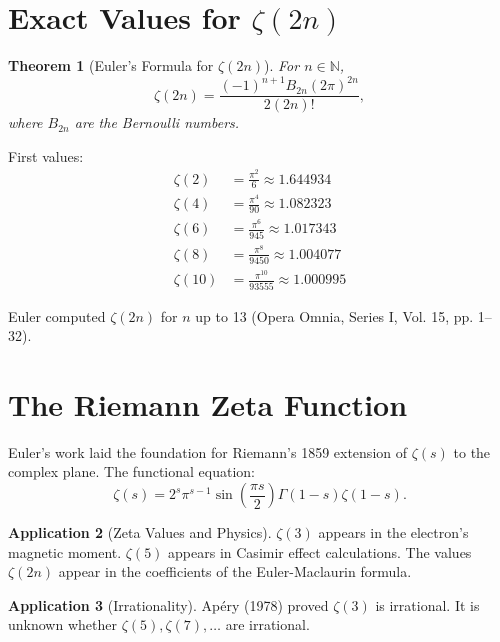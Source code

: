 \documentclass[11pt,a4paper,twoside]{book}
\theoremstyle{eulerstyle}
\newtheorem{theorem}{Theorem}[chapter]
\theoremstyle{definition}
\newtheorem{application}[theorem]{Application}
\newcommand{\N}{\mathbb{N}}
\begin{document}
\section{Exact Values for $\zeta(2n)$}

\begin{theorem}[Euler's Formula for $\zeta(2n)$]
For $n \in \N$,
\[
\zeta(2n) = \frac{(-1)^{n+1} B_{2n} (2\pi)^{2n}}{2(2n)!},
\]
where $B_{2n}$ are the Bernoulli numbers.
\end{theorem}

First values:
\begin{align*}
\zeta(2)  &= \frac{\pi^2}{6} \approx 1.644934 \\
\zeta(4)  &= \frac{\pi^4}{90} \approx 1.082323 \\
\zeta(6)  &= \frac{\pi^6}{945} \approx 1.017343 \\
\zeta(8)  &= \frac{\pi^8}{9450} \approx 1.004077 \\
\zeta(10) &= \frac{\pi^{10}}{93555} \approx 1.000995
\end{align*}

Euler computed $\zeta(2n)$ for $n$ up to 13 (Opera Omnia, Series I, Vol. 15, pp. 1--32).

\section{The Riemann Zeta Function}

Euler's work laid the foundation for Riemann's 1859 extension of $\zeta(s)$ to the complex plane. The functional equation:
\[
\zeta(s) = 2^s \pi^{s-1} \sin\left(\frac{\pi s}{2}\right) \Gamma(1-s) \zeta(1-s).
\]

\begin{application}[Zeta Values and Physics]
$\zeta(3)$ appears in the electron's magnetic moment. $\zeta(5)$ appears in Casimir effect calculations. The values $\zeta(2n)$ appear in the coefficients of the Euler-Maclaurin formula.
\end{application}

\begin{application}[Irrationality]
Apéry (1978) proved $\zeta(3)$ is irrational. It is unknown whether $\zeta(5), \zeta(7), \dots$ are irrational.
\end{application}

\cleardoublepage

\end{document}
